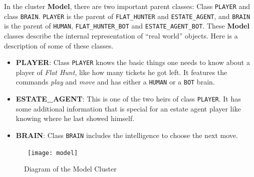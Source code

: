 In the cluster \textbf{Model}, there are two important parent classes: Class \texttt{PLAYER} and class \texttt{BRAIN}. \texttt{PLAYER} is the parent of \texttt{FLAT\_HUNTER} and \texttt{ESTATE\_AGENT}, and \texttt{BRAIN} is the parent of \texttt{HUMAN}, \texttt{FLAT\_HUNTER\_BOT} and \texttt{ESTATE\_AGENT\_BOT}. These \textbf{Model} classes describe the internal representation of ``real world'' objects. Here is a description of some of these classes.

\begin{itemize}
  \item{\textbf{PLAYER}: Class \texttt{PLAYER} knows the basic things one needs to know about a player of \emph{Flat Hunt}, like how many tickets he got left. It features the commands \textit{play} and \textit{move} and has either a \texttt{HUMAN} or a \texttt{BOT} brain.}
  \item{\textbf{ESTATE\_AGENT}: This is one of the two heirs of class \texttt{PLAYER}. It has some additional information that is special for an estate agent player like knowing where he last showed himself.}
  \item{\textbf{BRAIN}: Class \texttt{BRAIN} includes the intelligence to choose the next move.}
\end{itemize}

\begin{figure}[h]
\centerline{\hbox{  
  \texttt{[image: model]}
  }}
\caption{Diagram of the Model Cluster}
\label{modeldiagram}
\end{figure}
